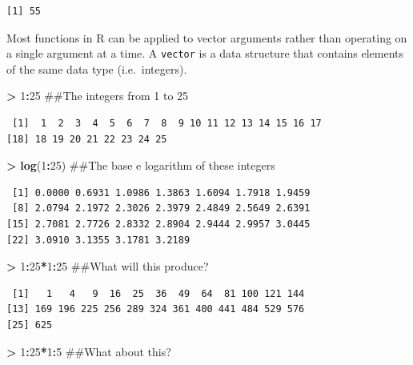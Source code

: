 \documentclass[]{krantz}
\makeatletter
\newenvironment{Shaded}{\begin{snugshade}}{\end{snugshade}}
\newcommand{\KeywordTok}[1]{\textcolor[rgb]{0.27,0.27,0.27}{\textbf{#1}}}
\newcommand{\DecValTok}[1]{\textcolor[rgb]{0.06,0.06,0.06}{#1}}
\newcommand{\StringTok}[1]{\textcolor[rgb]{0.5,0.5,0.5}{#1}}
\newcommand{\OperatorTok}[1]{\textcolor[rgb]{0.43,0.43,0.43}{\textbf{#1}}}
\newcommand{\NormalTok}[1]{#1}
\newenvironment{kframe}{%
\medskip{}
\setlength{\fboxsep}{.8em}
 \def\at@end@of@kframe{}%
 \ifinner\ifhmode%
  \def\at@end@of@kframe{\end{minipage}}%
  \begin{minipage}{\columnwidth}%
 \fi\fi%
 \def\FrameCommand##1{\hskip\@totalleftmargin \hskip-\fboxsep
 \colorbox{shadecolor}{##1}\hskip-\fboxsep
     \hskip-\linewidth \hskip-\@totalleftmargin \hskip\columnwidth}%
 \MakeFramed {\advance\hsize-\width
   \@totalleftmargin\z@ \linewidth\hsize
   \@setminipage}}%
 {\par\unskip\endMakeFramed%
 \at@end@of@kframe}
\renewenvironment{Shaded}{\begin{kframe}}{\end{kframe}}
\makeatother
\begin{document}
\begin{verbatim}
[1] 55
\end{verbatim}

Most functions in R can be applied to vector arguments rather than
operating on a single argument at a time. A \texttt{vector} is a data
structure that contains elements of the same data type (i.e.~integers).

\begin{Shaded}
\begin{Highlighting}[]
\OperatorTok{>}\StringTok{ }\DecValTok{1}\OperatorTok{:}\DecValTok{25}\NormalTok{ ##The integers from 1 to 25}
\end{Highlighting}
\end{Shaded}

\begin{verbatim}
 [1]  1  2  3  4  5  6  7  8  9 10 11 12 13 14 15 16 17
[18] 18 19 20 21 22 23 24 25
\end{verbatim}

\begin{Shaded}
\begin{Highlighting}[]
\OperatorTok{>}\StringTok{ }\KeywordTok{log}\NormalTok{(}\DecValTok{1}\OperatorTok{:}\DecValTok{25}\NormalTok{) ##The base e logarithm of these integers}
\end{Highlighting}
\end{Shaded}

\begin{verbatim}
 [1] 0.0000 0.6931 1.0986 1.3863 1.6094 1.7918 1.9459
 [8] 2.0794 2.1972 2.3026 2.3979 2.4849 2.5649 2.6391
[15] 2.7081 2.7726 2.8332 2.8904 2.9444 2.9957 3.0445
[22] 3.0910 3.1355 3.1781 3.2189
\end{verbatim}

\begin{Shaded}
\begin{Highlighting}[]
\OperatorTok{>}\StringTok{ }\DecValTok{1}\OperatorTok{:}\DecValTok{25}\OperatorTok{*}\DecValTok{1}\OperatorTok{:}\DecValTok{25}\NormalTok{ ##What will this produce?}
\end{Highlighting}
\end{Shaded}

\begin{verbatim}
 [1]   1   4   9  16  25  36  49  64  81 100 121 144
[13] 169 196 225 256 289 324 361 400 441 484 529 576
[25] 625
\end{verbatim}

\begin{Shaded}
\begin{Highlighting}[]
\OperatorTok{>}\StringTok{ }\DecValTok{1}\OperatorTok{:}\DecValTok{25}\OperatorTok{*}\DecValTok{1}\OperatorTok{:}\DecValTok{5}\NormalTok{ ##What about this?}
\end{Highlighting}
\end{Shaded}
\end{document}
